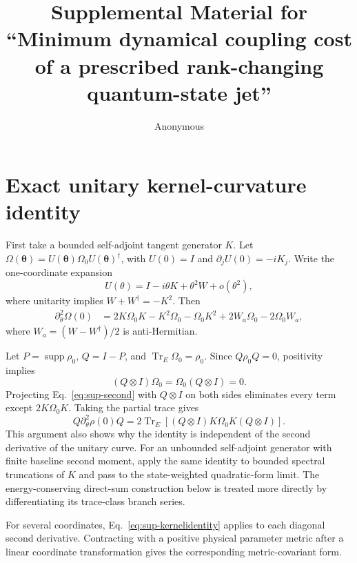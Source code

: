 \documentclass[aps,pra,preprint,nofootinbib]{revtex4-2}
\newcommand{\Tr}{\operatorname{Tr}}
\newcommand{\supp}{\operatorname{supp}}
\newcommand{\rhozero}{\rho_0}
\newcommand{\Omegazero}{\Omega_0}
\begin{document}
\title{Supplemental Material for ``Minimum dynamical coupling cost of a prescribed rank-changing quantum-state jet''}
\author{Anonymous}
\maketitle

\section{Exact unitary kernel-curvature identity}

First take a bounded self-adjoint tangent generator $K$. Let $\Omega(\bm\theta)=U(\bm\theta)\Omegazero U(\bm\theta)^\dagger$, with $U(0)=I$ and $\partial_jU(0)=-iK_j$. Write the one-coordinate expansion
\begin{equation}
 U(\theta)=I-i\theta K+\theta^2 W+o(\theta^2),
\end{equation}
where unitarity implies $W+W^\dagger=-K^2$. Then
\begin{align}
 \partial_\theta^2\Omega(0)
 &=2K\Omegazero K-K^2\Omegazero-\Omegazero K^2
 +2W_a\Omegazero-2\Omegazero W_a,
 \label{eq:sup-second}
\end{align}
where $W_a=(W-W^\dagger)/2$ is anti-Hermitian.

Let $P=\supp\rhozero$, $Q=I-P$, and $\Tr_E\Omegazero=\rhozero$. Since $Q\rhozero Q=0$, positivity implies
\begin{equation}
 (Q\otimes I)\Omegazero=\Omegazero(Q\otimes I)=0.
 \label{eq:sup-support}
\end{equation}
Projecting Eq.~\eqref{eq:sup-second} with $Q\otimes I$ on both sides eliminates every term except $2K\Omegazero K$. Taking the partial trace gives
\begin{equation}
 Q\partial_\theta^2\rho(0)Q
 =2\Tr_E[(Q\otimes I)K\Omegazero K(Q\otimes I)].
 \label{eq:sup-kernelidentity}
\end{equation}
This argument also shows why the identity is independent of the second derivative of the unitary curve. For an unbounded self-adjoint generator with finite baseline second moment, apply the same identity to bounded spectral truncations of $K$ and pass to the state-weighted quadratic-form limit. The energy-conserving direct-sum construction below is treated more directly by differentiating its trace-class branch series.

For several coordinates, Eq.~\eqref{eq:sup-kernelidentity} applies to each diagonal second derivative. Contracting with a positive physical parameter metric after a linear coordinate transformation gives the corresponding metric-covariant form.
\end{document}
